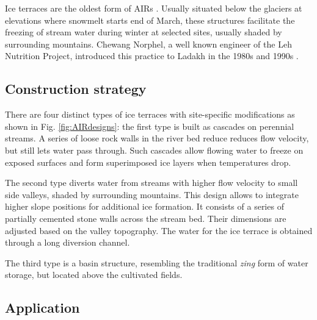 Ice terraces are the oldest form of AIRs \citep{norphelArtificialGlacierHigh2009}. Usually situated below the
glaciers at elevations where snowmelt starts end of March, these structures facilitate the freezing of stream
water during winter at selected sites, usually shaded by surrounding mountains. Chewang Norphel, a well known
engineer of the Leh Nutrition Project, introduced this practice to Ladakh in the 1980s and 1990s
\citep{vinceGlacierMan2009}.

\subsection{Construction strategy}

There are four distinct types of ice terraces with site-specific modifications as shown in Fig.
\ref{fig:AIRdesigns}: the first type is built as cascades on perennial streams. A series of loose rock walls in
the river bed reduce reduces flow velocity, but still lets water pass through. Such cascades allow flowing water
to freeze on exposed surfaces and form superimposed ice layers when temperatures drop. 

The second type diverts water from streams with higher flow velocity to small side valleys, shaded by
surrounding mountains. This design allows to integrate higher slope positions for additional ice formation. It
consists of a series of partially cemented stone walls across the stream bed. Their dimensions are adjusted
based on the valley topography. The water for the ice terrace is obtained through a long diversion channel. 

The third type is a basin structure, resembling the traditional {\it zing} form of water storage, but located
above the cultivated fields.

\subsection{Application}


